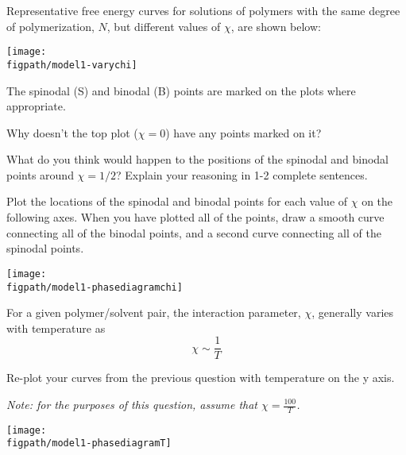 \begin{activity}
\begin{instructornotes}
\end{instructornotes}



\begin{model}
\label{\labelbase:mdl:spinodalbinodal}

	Representative free energy curves for solutions of polymers with the same degree of polymerization, $N$, but different values of $\chi$, are shown below:
	
	\centerline{\texttt{[image: \\figpath/model1-varychi]}}
	
	The spinodal (S) and binodal (B) points are marked on the plots where appropriate.
\end{model}

\begin{ctqs}
	
	\question Why doesn't the top plot ($\chi=0$) have any points marked on it?
	
	\question What do you think would happen to the positions of the spinodal and binodal points around $\chi=1/2$? Explain your reasoning in 1-2 complete sentences.
	
	\question Plot the locations of the spinodal and binodal points for each value of $\chi$ on the following axes.  When you have plotted all of the points, draw a smooth curve connecting all of the binodal points, and a second curve connecting all of the spinodal points.
	
		\centerline{\texttt{[image: \\figpath/model1-phasediagramchi]}}
		
\end{ctqs}


\begin{infobox}
	For a given polymer/solvent pair, the interaction parameter, $\chi$, generally varies with temperature as
	\begin{equation*}
		\chi \sim \frac{1}{T}
	\end{equation*}
\end{infobox}


\begin{ctqs}

	\question Re-plot your curves from the previous question with temperature on the y axis.
	
		\emph{Note: for the purposes of this question, assume that $\chi = \frac{100}{T}$.}
	
		\centerline{\texttt{[image: \\figpath/model1-phasediagramT]}}
		

\end{ctqs}
\end{activity}
